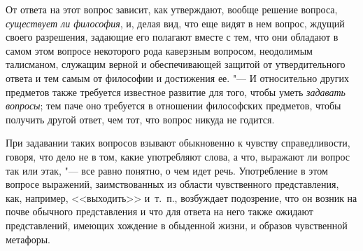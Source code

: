 От ответа на этот вопрос зависит, как утверждают, вообще решение вопроса,
{\em существует ли философия}, и, делая вид, что еще
видят в нем вопрос, ждущий своего разрешения, задающие его полагают вместе
с тем, что они обладают в самом этом вопросе некоторого рода каверзным
вопросом, неодолимым талисманом, служащим верной и обеспечивающей защитой
от утвердительного ответа и тем самым от философии и достижения ее. "--- И
относительно других предметов также требуется известное развитие для того,
чтобы уметь {\em задавать вопросы}; тем паче оно
требуется в отношении философских предметов, чтобы получить другой ответ,
чем тот, что вопрос никуда не годится.

При задавании таких вопросов взывают обыкновенно к чувству справедливости,
говоря, что дело не в том, какие употребляют слова, а что, выражают ли
вопрос так или этак, "--- все равно понятно, о чем идет речь. Употребление в
этом вопросе выражений, заимствованных из области чувственного
представления, как, например, <<выходить>> и~т.~п., возбуждает подозрение,
что он возник на почве обычного представления и что для ответа на него
также ожидают представлений, имеющих хождение в обыденной жизни, и образов
чувственной метафоры.

